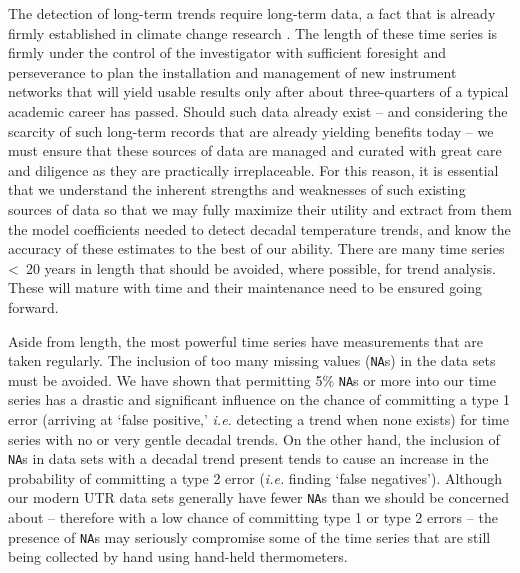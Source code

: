 \documentclass[]{ametsoc}
\begin{document}
The detection of long-term trends require long-term data, a fact that is already firmly established in climate change research \citep{Ohring2005, IPCC2013}. The length of these time series is firmly under the control of the investigator with sufficient foresight and perseverance to plan the installation and management of new instrument networks that will yield usable results only after about three-quarters of a typical academic career has passed. Should such data already exist -- and considering the scarcity of such long-term records that are already yielding benefits today -- we must ensure that these sources of data are managed and curated with great care and diligence as they are practically irreplaceable. For this reason, it is essential that we understand the inherent strengths and weaknesses of such existing sources of data so that we may fully maximize their utility and extract from them the model coefficients needed to detect decadal temperature trends, and know the accuracy of these estimates to the best of our ability. There are many time series \textless~20 years in length that should be avoided, where possible, for trend analysis. These will mature with time and their maintenance need to be ensured going forward.

Aside from length, the most powerful time series have measurements that are taken regularly. The inclusion of too many missing values (\texttt{NA}s) in the data sets must be avoided. We have shown that permitting 5\% \texttt{NA}s or more into our time series has a drastic and significant influence on the chance of committing a type 1 error (arriving at `false positive,' \emph{i.e.} detecting a trend when none exists) for time series with no or very gentle decadal trends. On the other hand, the inclusion of \texttt{NA}s in data sets with a decadal trend present tends to cause an increase in the probability of committing a type 2 error (\emph{i.e.} finding `false negatives'). Although our modern UTR data sets generally have fewer \texttt{NA}s than we should be concerned about -- therefore with a low chance of committing type 1 or type 2 errors -- the presence of \texttt{NA}s may seriously compromise some of the time series that are still being collected by hand using hand-held thermometers.
\end{document}
